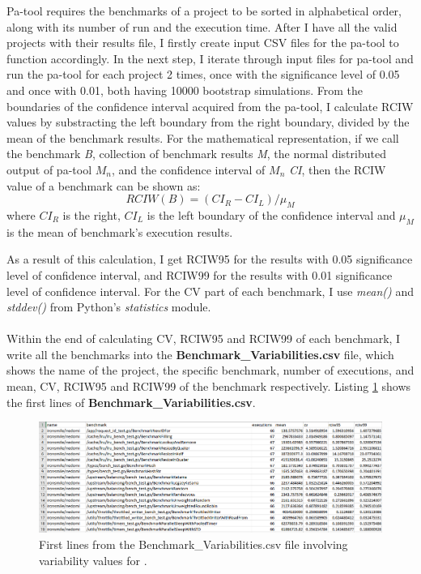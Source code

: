 \documentclass{seal_thesis}
\begin{document}
Pa-tool requires the benchmarks of a project to be sorted in alphabetical order, along with its number of run and the execution time. After I have all the valid projects with their results file, I firstly create input CSV files for the pa-tool to function accordingly. In the next step, I iterate through input files for pa-tool and run the pa-tool for each project 2 times, once with the significance level of 0.05 and once with 0.01, both having 10000 bootstrap simulations. From the boundaries of the confidence interval acquired from the pa-tool, I calculate RCIW values by substracting the left boundary from the right boundary, divided by the mean of the benchmark results. For the mathematical representation, if we call the benchmark \textit{B}, collection of benchmark results \textit{M}, the normal distributed output of pa-tool $M_{n}$, and the confidence interval of $M_{n}$ \textit{CI}, then the RCIW value of a benchmark can be shown as:
\[ RCIW(B) = ({CI_{R}} - {CI_{L}}) / \mu _{M} \]
where $CI_{R}$ is the right, $CI_{L}$ is the left boundary of the confidence interval and $\mu _{M}$ is the mean of benchmark's execution results.

\noindent As a result of this calculation, I get RCIW95 for the results with 0.05 significance level of confidence interval, and RCIW99 for the results with 0.01 significance level of confidence interval. For the CV part of each benchmark, I use \textit{mean()} and \textit{stddev()} from Python's \textit{statistics} module\cite{pythonsta}.\\
\\
Within the end of calculating CV, RCIW95 and RCIW99 of each benchmark, I write all the benchmarks into the \textbf{Benchmark\_Variabilities.csv} file, which shows the name of the project, the specific benchmark, number of executions, and mean, CV, RCIW95 and RCIW99 of the benchmark respectively. Listing \ref{fig:finalcsv} shows the first lines of \textbf{Benchmark\_Variabilities.csv}.

\begin{figure}[H]
	\centering
	\includegraphics[width=\linewidth]{finalcsvexample}
	\caption{First lines from the Benchmark\_Variabilities.csv file involving variability values for \cite{ironsmile/nedomi}.}
	\label{fig:finalcsv}
\end{figure}
\end{document}
